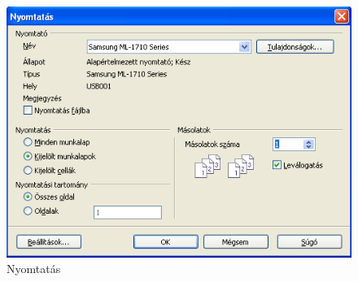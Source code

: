 \begin{figure}[!h]
\begin{center}
\includegraphics[width=12.52cm]{oocalcv2-img169.png}
\caption{Nyomtatás}\label{Nyomtatás}
\end{center}
\end{figure}

